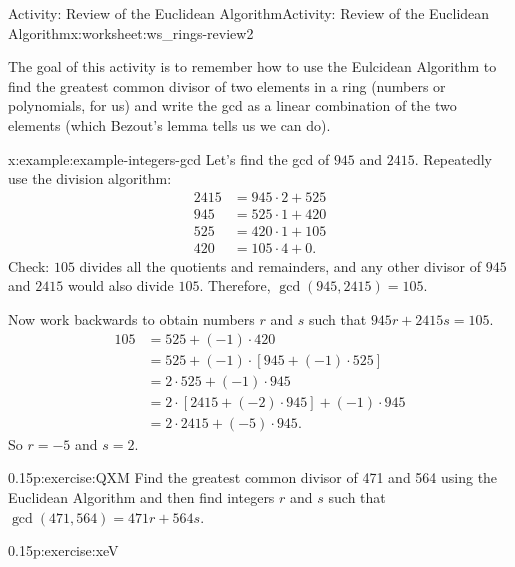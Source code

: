 \documentclass[11pt]{book}
\begin{document}
%
%
\typeout{************************************************}
\typeout{************************************************}
%
\begin{worksheet-subsection}{Activity: Review of the Euclidean Algorithm}{}{Activity: Review of the Euclidean Algorithm}{}{}{x:worksheet:ws_rings-review2}
\begin{introduction}{}%
The goal of this activity is to remember how to use the Eulcidean Algorithm to find the greatest common divisor of two elements in a ring (numbers or polynomials, for us) and write the gcd as a linear combination of the two elements (which Bezout's lemma tells us we can do).%
\begin{example}{}{x:example:example-integers-gcd}%
Let's find the gcd of \(945\) and \(2415\). Repeatedly use the division algorithm:%
\begin{align*}
2415 & = 945 \cdot 2 + 525\\
945 & = 525 \cdot 1 + 420\\
525 & = 420 \cdot 1 + 105\\
420 & = 105 \cdot 4 + 0\text{.}
\end{align*}
Check: \(105\) divides all the quotients and remainders, and any other divisor of \(945\) and \(2415\) would also divide \(105\). Therefore, \(\gcd( 945, 2415 ) = 105\).%
\par
Now work backwards to obtain numbers \(r\) and \(s\) such that \(945 r + 2415 s = 105\).%
\begin{align*}
105 & = 525 + (-1) \cdot 420\\
& = 525 + (-1) \cdot [945 + (-1) \cdot 525]\\
& = 2 \cdot 525 + (-1) \cdot 945\\
& = 2 \cdot [2415 + (-2) \cdot 945] + (-1) \cdot 945\\
& = 2 \cdot 2415 + (-5) \cdot 945\text{.}
\end{align*}
So \(r = -5\) and \(s= 2\).%
\end{example}
\end{introduction}%
\begin{divisionexercise}{1}{}{0.15}{p:exercise:QXM}%
Find the greatest common divisor of 471 and 564 using the Euclidean Algorithm and then find integers \(r\) and \(s\) such that \(\gcd(471,564) = 471r+564s\).%
\end{divisionexercise}%
\begin{divisionexercise}{2}{}{0.15}{p:exercise:xeV}%

\end{divisionexercise}
\end{worksheet-subsection}
\end{document}
